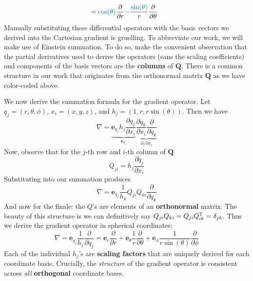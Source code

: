 \documentclass[a4paper]{article}
\begin{document}
\begin{enumerate}[label=(\alph*)]
\begin{align*}
					     & = \textcolor{teal}{\cos\!\left(\theta\right)}\frac{\partial }{\partial r} \textcolor{teal}{-} \frac{\textcolor{teal}{\sin\!\left(\theta\right)}}{r}\frac{\partial }{\partial \theta}
	\end{align*}
	Manually substituting these differential operators with the basis vectors we derived into the Cartesian gradient is gruelling. To abbreviate our work, we will make use of Einstein summation. To do so, make the convenient observation that the partial derivatives used to derive the operators (sans the scaling coefficients) and components of the basis vectors are the \textbf{columns} of \( \pmb{Q} \). There is a common structure in our work that originates from the orthonormal matrix \( \pmb{Q} \) as we have color-coded above.

	We now derive the summation formula for the gradient operator. Let \( q_{j} = \!\left( r,\theta,\phi \right) \), \( x_{i} = \!\left( x,y,z \right) \), and \( h_{j} = \!\left( 1,r,r \sin\!\left(\theta\right) \right) \). Then we have
\[
	\nabla = \underbrace{\pmb{e}_{q_{j}}h_{j}\frac{\partial q_{j}}{\partial x_{i}}}_{\pmb{e}_{x_{i}}}\underbrace{\frac{\partial q_{k}}{\partial x_{i}}\frac{\partial }{\partial q_{k}}}_{\partial / \partial x_{i}}
\]
Now, observe that for the \( j \)-th row and \( i \)-th column of \( \pmb{Q} \)
\[
	Q_{ji} = h_{j}\frac{\partial q_{j}}{\partial x_{i}}
\]
Substituting into our summation produces
\[
	\nabla = \pmb{e}_{q_{j}}\frac{1}{h_{k}}Q_{ji}Q_{ki}\frac{\partial }{\partial q_{k}} 
\]
And now for the finale: the \( Q \)'s are elements of an \textbf{orthonormal} matrix. The beauty of this structure is we can definitively say \( Q_{ji}Q_{ki} = Q_{ji}Q^{\textsc{T}}_{ik} = \delta_{jk} \). Thus we derive the gradient operator in spherical coordinates:
\[
	\nabla = \pmb{e}_{q_{j}}\frac{1}{h_{j}}\frac{\partial }{\partial q_{j}} = \pmb{e}_{r}\frac{\partial }{\partial r} + \pmb{e}_{\theta}\frac{1}{r}\frac{\partial }{\partial \theta} + \pmb{e}_{\phi}\frac{1}{r \sin\!\left(\theta\right)}\frac{\partial }{\partial \phi}
\]
Each of the individual \( h_{j} \)'s are \textbf{scaling factors} that are uniquely derived for each coordinate basis. Crucially, the \textit{structure} of the gradient operator is consistent across \textit{all} \textbf{orthogonal} coordinate bases.


\end{enumerate}
\end{document}
